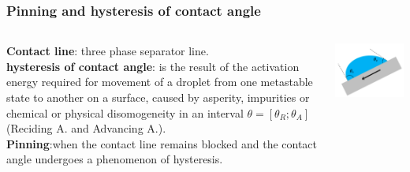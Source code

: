 \documentclass[xcolor=table]{beamer}
\begin{document}
\begin{frame}

\frametitle{Pinning and hysteresis of contact angle}
\fontsize{11}{13.2} \selectfont
\begin{columns}
\begin{column}{.55\textwidth}
\textbf{Contact line}: three phase separator line.\\
\medskip
\textbf{hysteresis of contact angle}: is the result of the activation energy required for movement of a droplet from one metastable state to another on a surface, caused by asperity, impurities or chemical or physical disomogeneity in an interval $\theta=[\theta_R;\theta_A]$ (Reciding A. and Advancing A.).\\
\medskip
\textbf{Pinning}:when the contact line remains blocked and the contact angle undergoes a phenomenon of hysteresis.
\end{column}
\begin{column}{.25\textwidth}
		\includegraphics[width=1.3\columnwidth]{pinningg.png}
\end{column}
\end{columns}
\end{frame}


\end{document}
